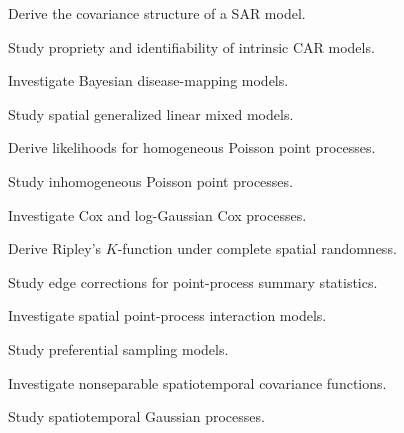 \begin{exercise}[4]
Derive the covariance structure of a SAR model.
\end{exercise}

\begin{exercise}[4]
Study propriety and identifiability of intrinsic CAR models.
\end{exercise}

\begin{exercise}[4]
Investigate Bayesian disease-mapping models.
\end{exercise}

\begin{exercise}[4]
Study spatial generalized linear mixed models.
\end{exercise}

\begin{exercise}[4]
Derive likelihoods for homogeneous Poisson point processes.
\end{exercise}

\begin{exercise}[4]
Study inhomogeneous Poisson point processes.
\end{exercise}

\begin{exercise}[4]
Investigate Cox and log-Gaussian Cox processes.
\end{exercise}

\begin{exercise}[4]
Derive Ripley's \(K\)-function under complete spatial randomness.
\end{exercise}

\begin{exercise}[4]
Study edge corrections for point-process summary statistics.
\end{exercise}

\begin{exercise}[4]
Investigate spatial point-process interaction models.
\end{exercise}

\begin{exercise}[4]
Study preferential sampling models.
\end{exercise}

\begin{exercise}[4]
Investigate nonseparable spatiotemporal covariance functions.
\end{exercise}

\begin{exercise}[4]
Study spatiotemporal Gaussian processes.
\end{exercise}


